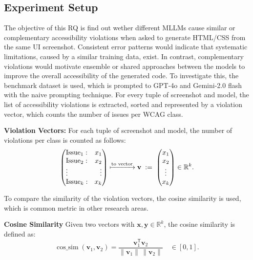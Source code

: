 \subsection{Experiment Setup}
The objective of this RQ is find out wether different MLLMs 
cause similar or complementary accessibility violations when 
asked to generate HTML/CSS from the same UI screenshot.
Consistent error patterns would indicate that systematic 
limitations, caused by a similar training data, exist. 
In contrast, complementary violations would motivate 
ensemble or shared approaches between the models to improve the 
overall accessibility of the generated code.
To investigate this, the benchmark dataset is used, which 
is prompted to GPT-4o and Gemini-2.0 flash with 
the naive prompting technique. For every tuple of
screenshot and model, the list of accessibility violations
is extracted, sorted and represented by a violation 
vector, which counts the number of issues per 
WCAG class. 



\newcommand{\vect}[1]{\begin{pmatrix}#1\end{pmatrix}}
\newcommand{\issues}{k}                   %
\newcommand{\vx}{\mathbf x}
\newcommand{\vy}{\mathbf y}

\textbf{Violation Vectors:}  
  For each tuple of screenshot and model, the number of violations per class is counted as follows:
  \[
  \left(
    \begin{array}{@{}l r@{}}
      \text{Issue}_{1}: & x_{1}\\
      \text{Issue}_{2}: & x_{2}\\
      \vdots           & \vdots\\
      \text{Issue}_{\issues}: & x_{\issues}
    \end{array}
  \right)
  \xmapsto{\text{to vector}}
  \mathbf v \;:=\;
  \vect{x_{1}\\x_{2}\\\vdots\\x_{\issues}} \in \mathbb R^{\issues}.
\]

To compare the similarity of the violation vectors, the 
cosine similarity is used, which is common metric in 
other research areas. 

\textbf{Cosine Similarity}  
  Given two vectors with $\vx,\vy\in\mathbb R^{\issues}$, the cosine similarity is defined as:
  \[
  \operatorname{cos\_sim}(\mathbf v_1,\mathbf v_2)=
  \frac{\mathbf v_1^{\mathsf T}\mathbf v_2}{\lVert \mathbf v_1\rVert\,\lVert \mathbf v_2\rVert}
  \quad\in[0,1].
\]



